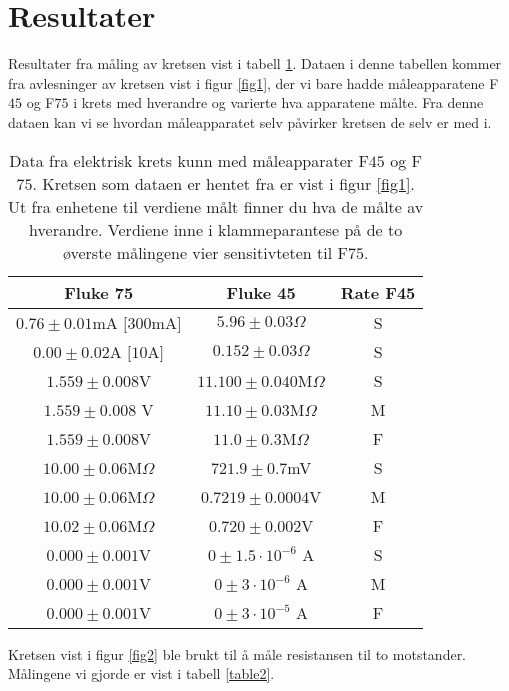 \documentclass[%
 reprint,
 amsmath,amssymb,
 aps,
]{revtex4-1}
\begin{document}
\section{Resultater}
Resultater fra måling av kretsen vist i tabell \ref{table1}. Dataen i denne tabellen kommer fra avlesninger av kretsen vist i figur \ref{fig1}, der vi bare hadde måleapparatene F$45$ og F$75$ i krets med hverandre og varierte hva apparatene målte. Fra denne dataen kan vi se hvordan måleapparatet selv påvirker kretsen de selv er med i. \\
\begin{table}[h!]
\caption{Data fra elektrisk krets kunn med måleapparater  F$45$ og F$75$. Kretsen som dataen er hentet fra er vist i figur \ref{fig1}. Ut fra enhetene til verdiene målt finner du hva de målte av hverandre. Verdiene inne i klammeparantese på de to øverste målingene vier sensitivteten til F$75$.}\centering
\label{table1}
\begin{tabular}{c c c}
\toprule
Fluke 75                 & Fluke 45                  & Rate F45 \\
\hline
$0.76 \pm  0.01$mA $[300$mA$]$       & $5.96 \pm 0.03 \Omega$ & S           \\
$0.00 \pm 0.02 $A $[10$A$]$       & $0.152 \pm 0.03 \Omega$  & S \\
$1.559 \pm 0.008$V       & $11.100 \pm 0.040 $M$\Omega$    & S        \\
$1.559 \pm 0.008$ V      & $11.10 \pm 0.03$M$\Omega$ & M        \\
$1.559 \pm 0.008$V       & $11.0 \pm 0.3 $M$\Omega$    & F        \\
$10.00 \pm 0.06$M$\Omega$  & $721.9 \pm 0.7 $mV       & S        \\
$10.00 \pm 0.06$M$\Omega$ & $0.7219 \pm 0.0004 $V   & M        \\
$10.02 \pm 0.06$M$\Omega$  & $0.720 \pm0.002$V         & F        \\
$0.000 \pm 0.001$V       & $0 \pm 1.5 \cdot 10^{-6}$ A     & S        \\
$0.000 \pm 0.001$V       & $0  \pm 3 \cdot 10^{-6}$ A      & M        \\
$0.000 \pm 0.001$V       & $0 \pm 3 \cdot 10^{-5}$ A       & F    \\
\end{tabular}
\end{table}
Kretsen vist i figur \ref{fig2} ble brukt til å måle resistansen til to motstander. Målingene vi gjorde er vist i tabell \ref{table2}. \\
\end{document}
